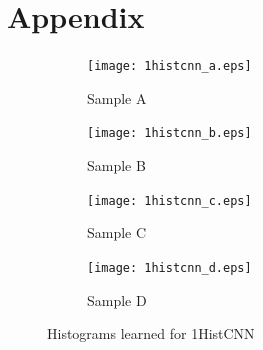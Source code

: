 \documentclass[10pt,twocolumn,letterpaper]{article}
\begin{document}
{\small


}


\section{Appendix}

\begin{figure}[htb]
	\centering
	\begin{subfigure}[b]{.20\textwidth}  %
		\centering
		\texttt{[image: 1histcnn\_a.eps]}
		\caption{Sample A}
	\end{subfigure}
	\hfill
	\begin{subfigure}[b]{.20\textwidth}
		\centering
		\texttt{[image: 1histcnn\_b.eps]}
		\caption{Sample B}
	\end{subfigure}
	\hfill
	\begin{subfigure}[b]{.20\textwidth}
		\centering
		\texttt{[image: 1histcnn\_c.eps]}
		\caption{Sample C}
	\end{subfigure}
	\hfill
	\begin{subfigure}[b]{.20\textwidth}
		\centering
		\texttt{[image: 1histcnn\_d.eps]}
		\caption{Sample D}
	\end{subfigure}
	
	\caption{Histograms learned for 1HistCNN}
	\label{fig:histogram_1cnn}
\end{figure}
\end{document}
